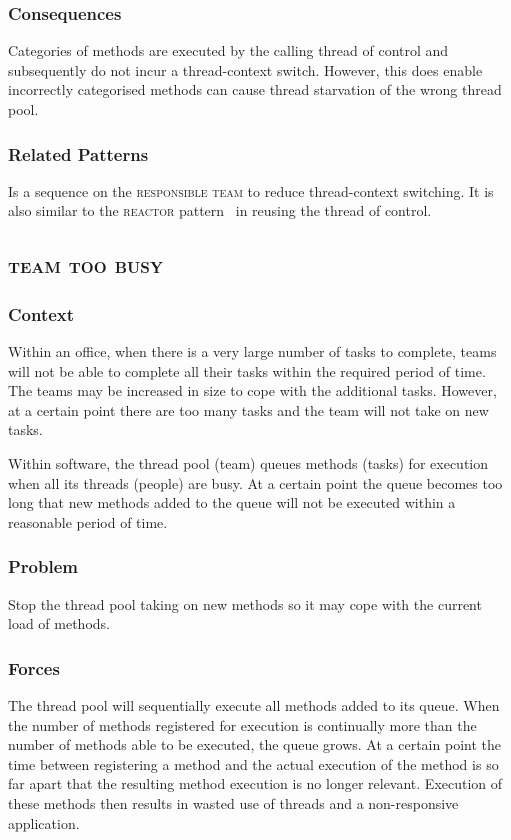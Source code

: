 \documentclass[prodmode]{style/acmlarge}
\begin{document}
\subsubsection*{Consequences} Categories of methods are executed by the calling
thread of control and subsequently do not incur a thread-context switch.
However, this does enable incorrectly categorised methods can cause thread
starvation of the wrong thread pool.

\subsubsection*{Related Patterns} Is a sequence on the \textsc{responsible team}
to reduce thread-context switching.  It is also similar to the \textsc{reactor}
pattern~\cite{reactor} in reusing the thread of control.



\subsection{\textsc{\textbf{team too busy}}}

\subsubsection*{Context} Within an office, when there is a very large number of
tasks to complete, teams will not be able to complete all their tasks within the
required period of time.  The teams may be increased in size to cope with the
additional tasks.  However, at a certain point there are too many tasks and the
team will not take on new tasks.

Within software, the thread pool (team) queues methods (tasks) for execution
when all its threads (people) are busy.  At a certain point the queue becomes
too long that new methods added to the queue will not be executed within a
reasonable period of time.

\subsubsection*{Problem} Stop the thread pool taking on new methods so it may
cope with the current load of methods.

\subsubsection*{Forces} The thread pool will sequentially execute all methods
added to its queue.  When the number of methods registered for execution is
continually more than the number of methods able to be executed, the queue
grows.  At a certain point the time between registering a method and the actual
execution of the method is so far apart that the resulting method execution is
no longer relevant.  Execution of these methods then results in wasted use of
threads and a non-responsive application.
\end{document}
